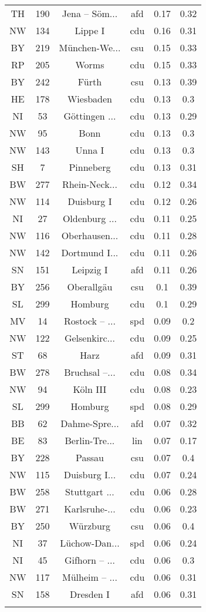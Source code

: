 \begin{table}[!htbp]
\begin{tabular}{@{\extracolsep{5pt}} cccccc}
TH & 190 & Jena – Söm... & afd & 0.17 & 0.32 \\ 
NW & 134 & Lippe I & cdu & 0.16 & 0.31 \\ 
BY & 219 & München-We... & csu & 0.15 & 0.33 \\ 
RP & 205 & Worms & cdu & 0.15 & 0.33 \\ 
BY & 242 & Fürth & csu & 0.13 & 0.39 \\ 
HE & 178 & Wiesbaden & cdu & 0.13 & 0.3 \\ 
NI & 53 & Göttingen ... & cdu & 0.13 & 0.29 \\ 
NW & 95 & Bonn & cdu & 0.13 & 0.3 \\ 
NW & 143 & Unna I & cdu & 0.13 & 0.3 \\ 
SH & 7 & Pinneberg & cdu & 0.13 & 0.31 \\ 
BW & 277 & Rhein-Neck... & cdu & 0.12 & 0.34 \\ 
NW & 114 & Duisburg I & cdu & 0.12 & 0.26 \\ 
NI & 27 & Oldenburg ... & cdu & 0.11 & 0.25 \\ 
NW & 116 & Oberhausen... & cdu & 0.11 & 0.28 \\ 
NW & 142 & Dortmund I... & cdu & 0.11 & 0.26 \\ 
SN & 151 & Leipzig I & afd & 0.11 & 0.26 \\ 
BY & 256 & Oberallgäu & csu & 0.1 & 0.39 \\ 
SL & 299 & Homburg & cdu & 0.1 & 0.29 \\ 
MV & 14 & Rostock – ... & spd & 0.09 & 0.2 \\ 
NW & 122 & Gelsenkirc... & cdu & 0.09 & 0.25 \\ 
ST & 68 & Harz & afd & 0.09 & 0.31 \\ 
BW & 278 & Bruchsal –... & cdu & 0.08 & 0.34 \\ 
NW & 94 & Köln III & cdu & 0.08 & 0.23 \\ 
SL & 299 & Homburg & spd & 0.08 & 0.29 \\ 
BB & 62 & Dahme-Spre... & afd & 0.07 & 0.32 \\ 
BE & 83 & Berlin-Tre... & lin & 0.07 & 0.17 \\ 
BY & 228 & Passau & csu & 0.07 & 0.4 \\ 
NW & 115 & Duisburg I... & cdu & 0.07 & 0.24 \\ 
BW & 258 & Stuttgart ... & cdu & 0.06 & 0.28 \\ 
BW & 271 & Karlsruhe-... & cdu & 0.06 & 0.23 \\ 
BY & 250 & Würzburg & csu & 0.06 & 0.4 \\ 
NI & 37 & Lüchow-Dan... & spd & 0.06 & 0.24 \\ 
NI & 45 & Gifhorn – ... & cdu & 0.06 & 0.3 \\ 
NW & 117 & Mülheim – ... & cdu & 0.06 & 0.31 \\ 
SN & 158 & Dresden I & afd & 0.06 & 0.31 \\ 
\hline \\[-1.8ex] 
\end{tabular} 
\end{table} 
